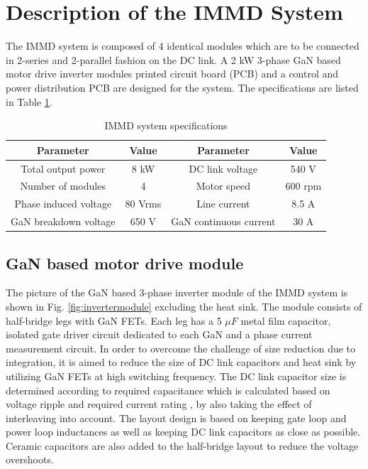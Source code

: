 
\section{Description of the IMMD System}

The IMMD system is composed of 4 identical modules which are to be connected in 2-series and 2-parallel fashion on the DC link. A 2 kW 3-phase GaN based motor drive inverter modules printed circuit board (PCB) and a control and power distribution PCB are designed for the system. The specifications are listed in Table \ref{table:specifications}.


\begin{table}[h]
    \caption{IMMD system specifications}
    \label{table:specifications}
    \centering
    \begin{tabular}{c c c c}
        \toprule
        Parameter & Value & Parameter & Value \\
        \hline
        Total output power & 8 kW & DC link voltage & 540 V \\
        Number of modules & 4 & Motor speed & 600 rpm \\
        Phase induced voltage & 80 Vrms & Line current & 8.5 A \\
        GaN breakdown voltage & 650 V & GaN continuous current & 30 A \\
        \bottomrule
    \end{tabular}
    \vspace{-10pt}
\end{table}

\subsection{GaN based motor drive module}

The picture of the GaN based 3-phase inverter module of the IMMD system is shown in Fig. \ref{fig:invertermodule} excluding the heat sink. The module consists of half-bridge legs with GaN FETs. Each leg has a 5 $\mu F$ metal film capacitor, isolated gate driver circuit dedicated to each GaN and a phase current measurement circuit. In order to overcome the challenge of size reduction due to integration, it is aimed to reduce the size of DC link capacitors and heat sink by utilizing GaN FETs at high switching frequency. The DC link capacitor size is determined according to required capacitance which is calculated based on voltage ripple and required current rating \cite{Ugur2017}, by also taking the effect of interleaving into account. The layout design is based on keeping gate loop and power loop inductances as well as keeping DC link capacitors as close as possible. Ceramic capacitors are also added to the half-bridge layout to reduce the voltage overshoots.

